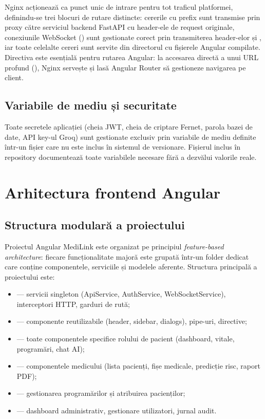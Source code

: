 Nginx acționează ca punct unic de intrare pentru tot traficul platformei, definindu-se trei blocuri de rutare distincte: cererile cu prefix  sunt transmise prin proxy către serviciul backend FastAPI cu header-ele de request originale, conexiunile WebSocket () sunt gestionate corect prin transmiterea header-elor  și , iar toate celelalte cereri sunt servite din directorul cu fișierele Angular compilate. Directiva  este esențială pentru rutarea Angular: la accesarea directă a unui URL profund (), Nginx servește  și lasă Angular Router să gestioneze navigarea pe client.

\subsection{Variabile de mediu și securitate}

Toate secretele aplicației (cheia JWT, cheia de criptare Fernet, parola bazei de date, API key-ul Groq) sunt gestionate exclusiv prin variabile de mediu definite într-un fișier  care nu este inclus în sistemul de versionare. Fișierul  inclus în repository documentează toate variabilele necesare fără a dezvălui valorile reale.

\section{Arhitectura frontend Angular}

\subsection{Structura modulară a proiectului}

Proiectul Angular MediLink este organizat pe principiul \textit{feature-based architecture}: fiecare funcționalitate majoră este grupată într-un folder dedicat care conține componentele, serviciile și modelele aferente. Structura principală a proiectului este:

\begin{itemize}
  \item {} --- servicii singleton (ApiService, AuthService, WebSocketService), interceptori HTTP, garduri de rută;
  \item {} --- componente reutilizabile (header, sidebar, dialogs), pipe-uri, directive;
  \item {} --- toate componentele specifice rolului de pacient (dashboard, vitale, programări, chat AI);
  \item {} --- componentele medicului (lista pacienți, fișe medicale, predicție risc, raport PDF);
  \item {} --- gestionarea programărilor și atribuirea pacienților;
  \item {} --- dashboard administrativ, gestionare utilizatori, jurnal audit.
\end{itemize}

